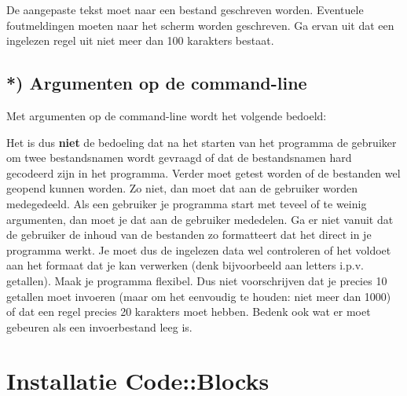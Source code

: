 \documentclass[a4paper,10pt,fleqn,twoside]{article}
\begin{document}
De aangepaste tekst moet naar een bestand geschreven worden. Eventuele foutmeldingen moeten naar het scherm worden geschreven. Ga ervan uit dat een ingelezen regel uit niet meer dan 100 karakters bestaat.


\subsection*{*) Argumenten op de command-line}
Met argumenten op de command-line wordt het volgende bedoeld:


Het is dus \textbf{niet} de bedoeling dat na het starten van het programma de gebruiker om twee bestandsnamen wordt gevraagd of dat de bestandsnamen hard gecodeerd zijn in het programma. Verder moet getest worden of de bestanden wel geopend kunnen worden. Zo niet, dan moet dat aan de gebruiker worden medegedeeld. Als een gebruiker je programma start met teveel of te weinig argumenten, dan moet je dat aan de gebruiker mededelen. Ga er niet vanuit dat de gebruiker de inhoud van de bestanden zo formatteert dat het direct in je programma werkt. Je moet dus de ingelezen data wel controleren of het voldoet aan het formaat dat je kan verwerken (denk bijvoorbeeld aan letters i.p.v. getallen). Maak je programma flexibel. Dus niet voorschrijven dat je precies 10 getallen moet invoeren (maar om het eenvoudig te houden: niet meer dan 1000) of dat een regel precies 20 karakters moet hebben. Bedenk ook wat er moet gebeuren als een invoerbestand leeg is.




\appendix

\section{Installatie Code::Blocks}
\label{sec:installcodeblocks}
\end{document}
